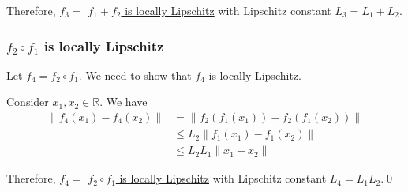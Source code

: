 Therefore, \( f_3 = \) \underline{\( f_1 + f_2 \) is locally Lipschitz} with Lipschitz constant \( L_3 = L_1 + L_2 \).

\subsubsection*{\( f_2 \circ f_1 \) is locally Lipschitz}

Let \( f_4 = f_2 \circ f_1 \).
We need to show that \( f_4 \) is locally Lipschitz.

Consider \( x_1, x_2 \in \mathbb{R} \).
We have
\begin{align*}
    \lVert f_4(x_1) - f_4(x_2) \rVert
     & =
    \lVert f_2(f_1(x_1)) - f_2(f_1(x_2)) \rVert
    \\ & \leq
    L_2 \lVert f_1(x_1) - f_1(x_2) \rVert
    \\ & \leq
    L_2 L_1 \lVert x_1 - x_2 \rVert
\end{align*}

Therefore, \( f_4 = \) \underline{\( f_2 \circ f_1 \) is locally Lipschitz} with Lipschitz constant \( L_4 = L_1 L_2 \).\qed
